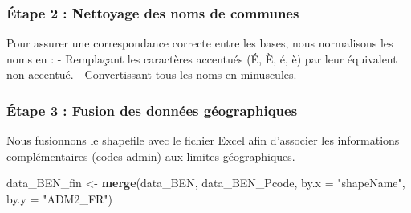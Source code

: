 \documentclass[
]{article}
\newenvironment{Shaded}{\begin{snugshade}}{\end{snugshade}}
\newcommand{\AttributeTok}[1]{\textcolor[rgb]{0.13,0.29,0.53}{#1}}
\newcommand{\CommentTok}[1]{\textcolor[rgb]{0.56,0.35,0.01}{\textit{#1}}}
\newcommand{\FunctionTok}[1]{\textcolor[rgb]{0.13,0.29,0.53}{\textbf{#1}}}
\newcommand{\NormalTok}[1]{#1}
\newcommand{\OtherTok}[1]{\textcolor[rgb]{0.56,0.35,0.01}{#1}}
\newcommand{\SpecialCharTok}[1]{\textcolor[rgb]{0.81,0.36,0.00}{\textbf{#1}}}
\newcommand{\StringTok}[1]{\textcolor[rgb]{0.31,0.60,0.02}{#1}}
\begin{document}
\hypertarget{uxe9tape-2-nettoyage-des-noms-de-communes}{%
\subsubsection{Étape 2 : Nettoyage des noms de
communes}\label{uxe9tape-2-nettoyage-des-noms-de-communes}}

Pour assurer une correspondance correcte entre les bases, nous
normalisons les noms en : - Remplaçant les caractères accentués (É, È,
é, è) par leur équivalent non accentué. - Convertissant tous les noms en
minuscules.

\begin{Shaded}
\end{Shaded}

\hypertarget{uxe9tape-3-fusion-des-donnuxe9es-guxe9ographiques}{%
\subsubsection{Étape 3 : Fusion des données
géographiques}\label{uxe9tape-3-fusion-des-donnuxe9es-guxe9ographiques}}

Nous fusionnons le shapefile avec le fichier Excel afin d'associer les
informations complémentaires (codes admin) aux limites géographiques.

\begin{Shaded}
\begin{Highlighting}[]
\NormalTok{data\_BEN\_fin }\OtherTok{\textless{}{-}} \FunctionTok{merge}\NormalTok{(data\_BEN, data\_BEN\_Pcode, }\AttributeTok{by.x =} \StringTok{"shapeName"}\NormalTok{, }\AttributeTok{by.y =} \StringTok{"ADM2\_FR"}\NormalTok{)}
\end{Highlighting}
\end{Shaded}
\end{document}
